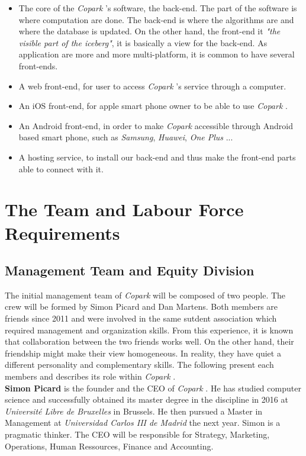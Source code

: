 \documentclass[12pt,a4paper,oneside]{book}
\newcommand{\bp}{\textit{Copark }}
\begin{document}
\begin{itemize}
\item The core of the \bp's software, the back-end. The part of the software is where computation are done. The back-end is where the algorithms are and where the database is updated. On the other hand, the front-end it \textit{"the visible part of the iceberg"}, it is basically a view for the back-end. As application are more and more multi-platform, it is common to have several front-ends.

\item A web front-end, for user to access \bp's service through a computer.

\item An iOS front-end, for apple smart phone owner to be able to use \bp.

\item An Android front-end, in order to make \bp accessible through Android based smart phone, such as \textit{Samsung}, \textit{Huawei}, \textit{One Plus} ...

\item A hosting service, to install our back-end and thus make the front-end parts able to connect with it.
\end{itemize}

\section{The Team and Labour Force Requirements}
\subsection{Management Team and Equity Division}
The initial management team of \bp will be composed of two people. The crew will be formed by Simon Picard and Dan Martens. Both members are friends since 2011 and were involved in the same sutdent association which required management and organization skills. From this experience, it is known that collaboration between the two friends works well. On the other hand, their friendship might make their view homogeneous. In reality, they have quiet a different personality and complementary skills. The following present each members and describes its role within \bp.\\

\textbf{Simon Picard} is the founder and the CEO of \bp. He has studied computer science and successfully obtained its master degree in the discipline in 2016 at \textit{Université Libre de Bruxelles} in Brussels. He then pursued a Master in Management at \textit{Universidad Carlos III de Madrid} the next year. Simon is a pragmatic thinker. The CEO will be responsible for Strategy, Marketing, Operations, Human Ressources, Finance and Accounting.\\
\end{document}
